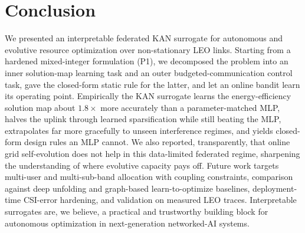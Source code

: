 \documentclass[journal]{IEEEtran}
\newcommand{\ratioNmse}{1.8}\newcommand{\ratioReg}{2.2}
\begin{document}
\section{Conclusion}\label{sec:conc}
We presented an interpretable federated KAN surrogate for autonomous and evolutive
resource optimization over non-stationary LEO links. Starting from a hardened
mixed-integer formulation (P1), we decomposed the problem into an inner
solution-map learning task and an outer budgeted-communication control task, gave
the closed-form static rule for the latter, and let an online bandit learn its
operating point. Empirically the KAN surrogate learns the energy-efficiency solution map
about $\ratioNmse\times$ more accurately than a parameter-matched MLP, halves the
uplink through learned sparsification while still beating the MLP, extrapolates far
more gracefully to unseen interference regimes, and yields closed-form design
rules an MLP cannot. We also reported, transparently, that online grid
self-evolution does not help in this data-limited federated regime, sharpening the
understanding of where evolutive capacity pays off. Future work targets multi-user
and multi-sub-band allocation with coupling constraints, comparison against deep
unfolding and graph-based learn-to-optimize baselines, deployment-time CSI-error
hardening, and validation on measured LEO traces. Interpretable surrogates are, we
believe, a practical and trustworthy building block for autonomous optimization in
next-generation networked-AI systems.

\appendices
\end{document}
